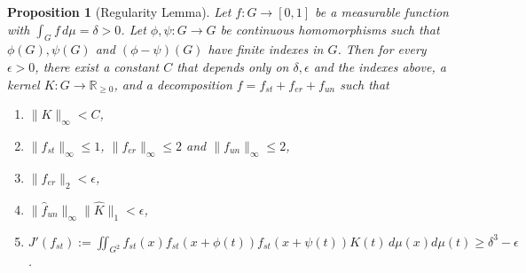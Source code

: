\documentclass[10pt]{article}
\newtheorem{proposition}[proposition]{Proposition}
\theoremstyle{definition}
\newcommand{\R}{\mathbb{R}}
\begin{document}

\begin{proposition}[Regularity Lemma]
\label{prop:regularity_lemma} Let $f: G \to [0, 1]$ be a measurable function with $\int_G f \, d \mu = \delta >0$. Let $\phi, \psi: G \to G$ be continuous homomorphisms such that $\phi(G), \psi(G)$ and $(\phi- \psi)(G)$ have finite indexes in $G$. Then for every $\epsilon > 0$, there exist a constant $C$ that depends only on $\delta, \epsilon$ and the indexes above, a kernel $K: G \to \R_{\geq 0}$, and a decomposition $f = f_{st} + f_{er} + f_{un}$ such that
\begin{enumerate}
    \item $\lVert K \rVert_{\infty} < C$,
    \item $\lVert f_{st} \rVert_{\infty} \leq 1$, $\lVert f_{er} \rVert_{\infty} \leq 2$ and $\lVert f_{un} \rVert_{\infty} \leq 2$,
    \item $\lVert f_{er} \rVert_2 < \epsilon$,
    \item $\lVert \widehat{f}_{un} \rVert_{\infty} \lVert \widehat{K} \rVert_1 < \epsilon$,
    \item $J'(f_{st}) := \displaystyle \iint_{G^2} f_{st}(x) f_{st}(x+ \phi(t)) f_{st}(x+ \psi(t)) K(t) \, d\mu(x) d\mu(t) \geq \delta^3 - \epsilon$.
\end{enumerate}

\end{proposition}
\end{document}

